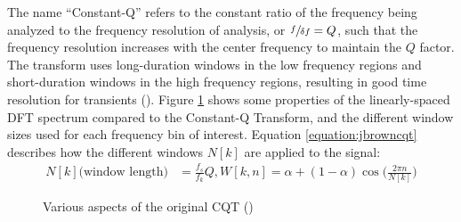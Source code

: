 \documentclass[report.tex]{subfiles}
\begin{document}
The name ``Constant-Q'' refers to the constant ratio of the frequency being analyzed to the frequency resolution of analysis, or $\sfrac{f}{\delta f} = Q$, such that the frequency resolution increases with the center frequency to maintain the $Q$ factor. The transform uses long-duration windows in the low frequency regions and short-duration windows in the high frequency regions, resulting in good time resolution for transients (\cite{cqtransient}). Figure \ref{fig:jbrowncqt} shows some properties of the linearly-spaced DFT spectrum compared to the Constant-Q Transform, and the different window sizes used for each frequency bin of interest. Equation \eqref{equation:jbrowncqt} describes how the different windows $N[k]$ are applied to the signal:
\begin{align}\tag{9}\label{equation:jbrowncqt}
	\nonumber N[k] \text{(window length)} &= \frac{f_{s}}{f_{k}}Q, W[k, n] = \alpha + (1 - \alpha)\cos\big(\frac{2\pi n}{N[k]}\big)
\end{align}

\begin{figure}[ht]
	\centering
	\hspace{0.5em}
	\caption{Various aspects of the original CQT (\cite[427, 428]{jbrown})}
	\label{fig:jbrowncqt}
\end{figure}
\end{document}
